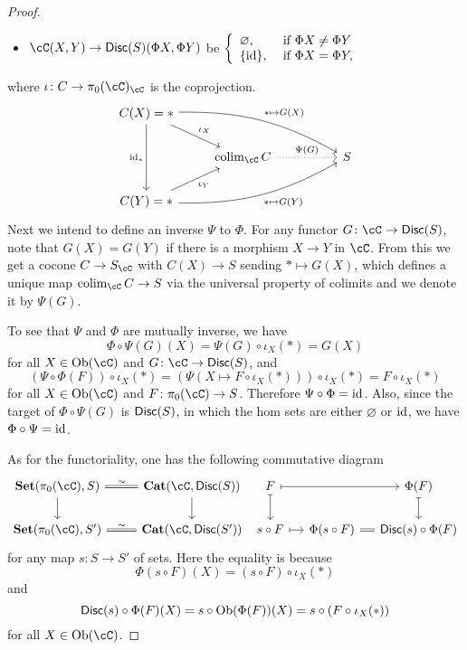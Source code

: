 \documentclass[a4paper,11pt,openany]{scrartcl}
\begin{document}
\begin{proof}
\begin{itemize}
\item $\cC(X,Y)\to\Disc(S)(\Phi X,\Phi Y)$ be $\left\{\begin{array}{ll}
\varnothing,&\text{ if }\Phi X\neq\Phi Y\\
\{\operatorname{id}\},&\text{ if }\Phi X=\Phi Y,
\end{array}\right.$
\end{itemize}
where $\iota\colon C\to \pi_0(\cC)_\cC$ is the coprojection.
\[
\begin{tikzcd}
C(X)=*\arrow[dr,"\iota_X"]\arrow[drrr,bend left=15,"*\mapsto G(X)"]\arrow[dd,"\id_*"']&&&\\
&\colim_\cC C\arrow[rr,dotted,"\Psi(G)"]&& S\\
C(Y)=*\arrow[ur,"\iota_Y"']\arrow[urrr,bend right=15,"*\mapsto G(Y)"']&&&
\end{tikzcd}
\]
Next we intend to define an inverse $\Psi$ to $\Phi$. For any functor $G\colon\cC\to\Disc(S)$, note that $G(X)=G(Y)$ if there is a morphism $X\to Y$ in $\cC$. From this we get a cocone $C\to S_\cC$ with $C(X)\to S$ sending $*\mapsto G(X)$, which defines a unique map $\colim_\cC C\to S$ via the universal property of colimits and we denote it by $\Psi(G)$. 

To see that $\Psi$ and $\Phi$ are mutually inverse, we have
\[
\Phi\circ\Psi(G)(X)=\Psi(G)\circ\iota_X(*)=G(X)
\]
for all $X\in\Ob(\cC)$ and $G\colon\cC\to\Disc (S)$, and
\[
(\Psi\circ\Phi(F))\circ\iota_X(*)=(\Psi(X\mapsto F\circ\iota_X(*)))\circ\iota_X(*)=F\circ\iota_X(*)
\]
for all $X\in\Ob(\cC)$ and $F\colon\pi_0(\cC)\to S$. Therefore $\Psi\circ\Phi=\operatorname{id}$. Also, since the target of $\Phi\circ\Psi(G)$ is $\operatorname{\mathsf{Disc}}(S)$, in which the hom sets are either $\varnothing$ or $\operatorname{id}$, we have $\Phi\circ\Psi=\operatorname{id}$. 

As for the functoriality, one has the following commutative diagram
\[
\begin{tikzcd}
\Set(\pi_0(\cC),S)\arrow[r,equal,"\sim"]\arrow[d]& \Cat(\cC,\Disc(S))\arrow[d]\\
\Set(\pi_0(\cC),S')\arrow[r,equal,"\sim"]& \Cat(\cC,\Disc(S'))
\end{tikzcd}
\ 
\begin{tikzcd}[column sep=small]
F\arrow[rr,mapsto]\arrow[d,mapsto]&& \Phi(F)\arrow[d,mapsto]\\
s\circ F\arrow[r,mapsto]& \Phi(s\circ F)\arrow[r,equal]& \Disc(s)\circ\Phi(F)
\end{tikzcd}
\]
for any map $s\colon S\to S'$ of sets. Here the equality is because
\[
\Phi(s\circ F)(X)=(s\circ F)\circ \iota_X(*)
\]
and
\[
\operatorname{\mathsf{Disc}}(s)\circ\Phi(F)(X)=s\circ\operatorname{Ob}(\Phi(F))(X)=s\circ(F\circ\iota_X(*))
\]
for all $X\in\Ob(\cC)$.


\end{proof}
\end{document}
